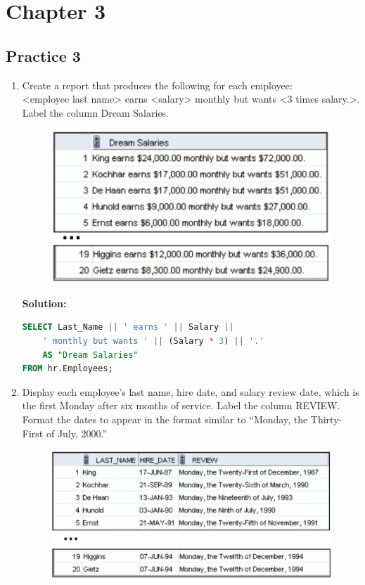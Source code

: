 \documentclass[a4paper,12pt]{article}
\begin{document}


\newpage
\section*{Chapter 3}
\subsection*{Practice 3}
\begin{enumerate}
    \item Create a report that produces the following for each employee: \\
\textless employee last name\textgreater{} earns \textless salary\textgreater{} monthly but wants \textless 3 times
salary.\textgreater{}. Label the column Dream Salaries.

    \begin{figure}[h]
        \centering
            \centering
            \includegraphics[width=.5\linewidth]{graphics/41.png}
    \end{figure}
    
    \textbf{Solution: }
    \begin{lstlisting}[language=SQL]
SELECT Last_Name || ' earns ' || Salary || 
    ' monthly but wants ' || (Salary * 3) || '.' 
    AS "Dream Salaries"
FROM hr.Employees;
    \end{lstlisting}
        \item Display each employee's last name, hire date, and salary review date, which is the first Monday
after six months of service. Label the column REVIEW. Format the dates to appear in the format
similar to “Monday, the Thirty-First of July, 2000.”

    \begin{figure}[h]
        \centering
            \centering
            \includegraphics[width=.6\linewidth]{graphics/42.png}
    \end{figure}
    

\end{enumerate}
\end{document}
